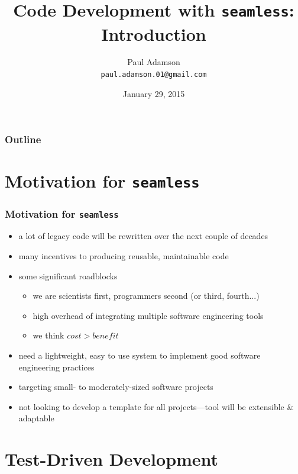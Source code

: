 \documentclass{beamer}
\title[\seamless Introduction]{Code Development with \texttt{seamless}: Introduction}
\author[Adamson]{Paul Adamson \\ \texttt{paul.adamson.01@gmail.com}}
\date{January 29, 2015}
\makeatletter
\newcommand*{\seamless}{\texttt{seamless}\@\xspace}
\makeatother
\begin{document}
\begin{frame}
  \titlepage
\end{frame}

\begin{frame}
  \frametitle{Outline}
  \tableofcontents
\end{frame}

\section{Motivation for \texttt{seamless}}
\begin{frame}
  \frametitle{Motivation for \seamless}
  \begin{itemize}
    \item a lot of legacy code will be rewritten over the next couple of decades
    \item many incentives to producing reusable, maintainable code\cite{petre}
    \item some significant roadblocks 
      \begin{itemize}
        \item we are scientists first, programmers second (or third, fourth...)
        \item high overhead of integrating multiple software engineering tools
        \item we think $cost > benefit$
      \end{itemize}
    \item need a lightweight, easy to use system to implement good software engineering
      practices
    \item targeting small- to moderately-sized software projects
    \item not looking to develop a template for all projects---tool will be extensible \& adaptable
  \end{itemize}
\end{frame}


\section{Test-Driven Development}
\end{document}
